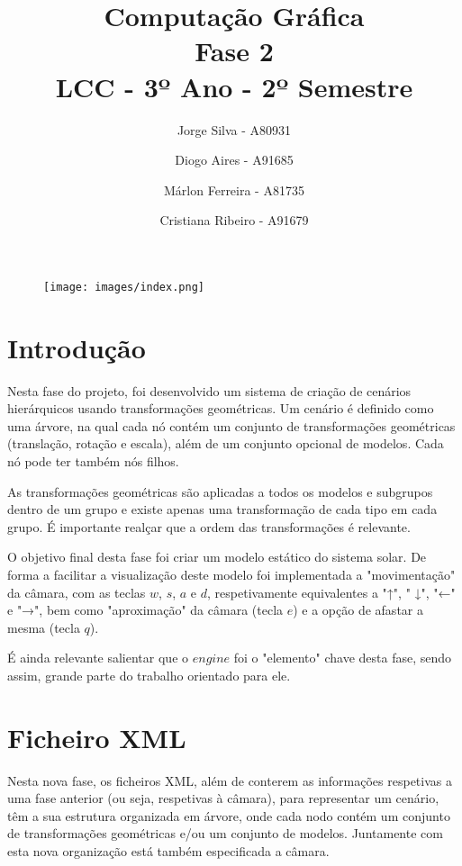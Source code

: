 \documentclass{article}
\date{}
\title{Computação Gráfica \\ Fase 2 \\ LCC - 3º Ano - 2º Semestre}
\author{Jorge Silva - A80931
        \and
        Diogo Aires - A91685
        \and
        Márlon Ferreira - A81735
        \and
        Cristiana Ribeiro - A91679}
\begin{document}
\large
\begin{figure}
    \centering
    \texttt{[image: images/index.png]}
\end{figure}

\maketitle
\newpage

\renewcommand{\contentsname}{Índice} 
\tableofcontents

\newpage

\section{Introdução}
Nesta fase do projeto, foi desenvolvido um sistema de criação de cenários hierárquicos usando transformações geométricas. Um cenário é definido como uma árvore, na qual cada nó contém um conjunto de transformações geométricas (translação, rotação e escala), além de um conjunto opcional de modelos. Cada nó pode ter também nós filhos.

As transformações geométricas são aplicadas a todos os modelos e subgrupos dentro de um grupo e existe apenas uma transformação de cada tipo em cada grupo. É importante realçar que a ordem das transformações é relevante.

O objetivo final desta fase foi criar um modelo estático do sistema solar. De forma a facilitar a visualização deste modelo foi implementada a "movimentação" da câmara, com as teclas $w$, $s$, $a$ e $d$, respetivamente equivalentes a "↑", " ↓", "←" e "→", bem como "aproximação" da câmara (tecla $e$) e a opção de afastar a mesma (tecla $q$). 

É ainda relevante salientar que o $engine$ foi o "elemento" chave desta fase, sendo assim, grande parte do trabalho orientado para ele.

\newpage

\section{Ficheiro XML}

Nesta nova fase, os ficheiros XML, além de conterem as informações respetivas a uma fase anterior (ou seja, respetivas à câmara), para representar um cenário, têm a sua estrutura organizada em árvore, onde cada nodo contém um conjunto de transformações geométricas e/ou um conjunto de modelos. Juntamente com esta nova organização está também especificada a câmara.
\end{document}
